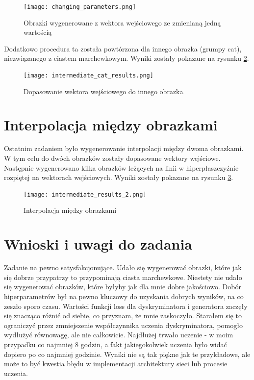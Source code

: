\documentclass[a4paper]{article}
\begin{document}
\begin{figure}[H]
    \centering
    \texttt{[image: changing\_parameters.png]}
    \caption{Obrazki wygenerowane z wektora wejściowego ze zmienianą jedną wartością}
    \label{fig:fitting_varying}
\end{figure}

Dodatkowo procedura ta została powtórzona dla innego obrazka (grumpy cat),
niezwiązanego z ciastem marchewkowym. Wyniki zostały pokazane
na rysunku \ref{fig:fitting_other}.

\begin{figure}[H]
    \centering
    \texttt{[image: intermediate\_cat\_results.png]}
    \caption{Dopasowanie wektora wejściowego do innego obrazka}
    \label{fig:fitting_other}
\end{figure}

\section{Interpolacja między obrazkami}

Ostatnim zadaniem było wygenerowanie interpolacji między dwoma obrazkami.
W tym celu do dwóch obrazków zostały dopasowane wektory wejściowe. Następnie
wygenerowano kilka obrazków leżących na linii w hiperpłaszczyźnie rozpiętej
na wektorach wejściowych. Wyniki zostały pokazane na rysunku \ref{fig:interpolation}.

\begin{figure}[H]
    \centering
    \texttt{[image: intermediate\_results\_2.png]}
    \caption{Interpolacja między obrazkami}
    \label{fig:interpolation}
\end{figure}

\section{Wnioski i uwagi do zadania}

Zadanie na pewno satysfakcjonujące. Udało się wygenerować obrazki, które
jak się dobrze przypatrzy to przypominają ciasta marchewkowe. Niestety
nie udało się wygenerować obrazków, które byłyby jak dla mnie dobre jakościowo.
Dobór hiperparametrów był na pewno kluczowy do uzyskania dobrych wyników,
na co zeszło sporo czasu. Wartości funkcji loss dla dyskryminatora i generatora
zaczęły się znacząco różnić od siebie, co przyznam, że mnie zaskoczyło. Starałem
się to ograniczyć przez zmniejszenie współczynnika uczenia dyskryminatora,
pomogło wydłużyć równowagę, ale nie całkowicie. Najdłużej trwało uczenie -
w moim przypadku co najmniej 8 godzin, a fakt jakiegokolwiek uczenia było widać
dopiero po co najmniej godzinie. Wyniki nie są tak piękne jak te przykładowe,
ale może to być kwestia błędu w implementacji architektury sieci lub procesie uczenia.
\end{document}
